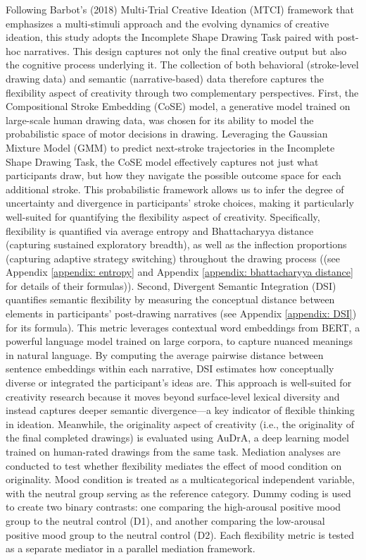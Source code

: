 \documentclass[../MA_Thesis.tex]{subfiles}
\begin{document}
Following Barbot’s (2018) Multi-Trial Creative Ideation (MTCI) framework that emphasizes a multi-stimuli approach and the evolving dynamics of creative ideation, this study adopts the Incomplete Shape Drawing Task paired with post-hoc narratives. This design captures not only the final creative output but also the cognitive process underlying it. The collection of both behavioral (stroke-level drawing data) and semantic (narrative-based) data therefore captures the flexibility aspect of creativity through two complementary perspectives. First, the Compositional Stroke Embedding (CoSE) model, a generative model trained on large-scale human drawing data, was chosen for its ability to model the probabilistic space of motor decisions in drawing. Leveraging the Gaussian Mixture Model (GMM) to predict next-stroke trajectories in the Incomplete Shape Drawing Task, the CoSE model effectively captures not just what participants draw, but how they navigate the possible outcome space for each additional stroke. This probabilistic framework allows us to infer the degree of uncertainty and divergence in participants’ stroke choices, making it particularly well-suited for quantifying the flexibility aspect of creativity. Specifically, flexibility is quantified via average entropy and Bhattacharyya distance (capturing sustained exploratory breadth), as well as the inflection proportions (capturing adaptive strategy switching) throughout the drawing process ((see Appendix \ref{appendix: entropy} and Appendix \ref{appendix: bhattacharyya distance} for details of their formulas)). Second, Divergent Semantic Integration (DSI) quantifies semantic flexibility by measuring the conceptual distance between elements in participants’ post-drawing narratives (see Appendix \ref{appendix: DSI}) for its formula). This metric leverages contextual word embeddings from BERT, a powerful language model trained on large corpora, to capture nuanced meanings in natural language. By computing the average pairwise distance between sentence embeddings within each narrative, DSI estimates how conceptually diverse or integrated the participant’s ideas are. This approach is well-suited for creativity research because it moves beyond surface-level lexical diversity and instead captures deeper semantic divergence—a key indicator of flexible thinking in ideation. Meanwhile, the originality aspect of creativity (i.e., the originality of the final completed drawings) is evaluated using AuDrA, a deep learning model trained on human-rated drawings from the same task. Mediation analyses are conducted to test whether flexibility mediates the effect of mood condition on originality. Mood condition is treated as a multicategorical independent variable, with the neutral group serving as the reference category. Dummy coding is used to create two binary contrasts: one comparing the high-arousal positive mood group to the neutral control (D1), and another comparing the low-arousal positive mood group to the neutral control (D2). Each flexibility metric is tested as a separate mediator in a parallel mediation framework.
\end{document}

